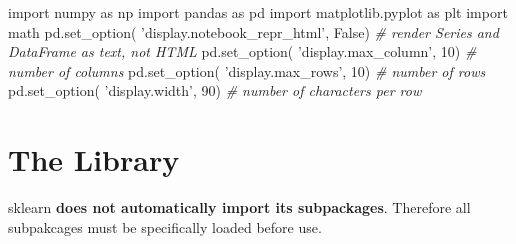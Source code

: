 \documentclass[
]{book}
\newenvironment{Shaded}{\begin{snugshade}}{\end{snugshade}}
\newcommand{\CommentTok}[1]{\textcolor[rgb]{0.37,0.37,0.37}{\textit{#1}}}
\newcommand{\DecValTok}[1]{\textcolor[rgb]{0.06,0.06,0.06}{#1}}
\newcommand{\ImportTok}[1]{#1}
\newcommand{\NormalTok}[1]{#1}
\newcommand{\StringTok}[1]{\textcolor[rgb]{0.5,0.5,0.5}{#1}}
\newcommand{\VariableTok}[1]{\textcolor[rgb]{0,0,0}{#1}}
\begin{document}
\begin{Shaded}
\begin{Highlighting}[]
\ImportTok{import}\NormalTok{ numpy }\ImportTok{as}\NormalTok{ np}
\ImportTok{import}\NormalTok{ pandas }\ImportTok{as}\NormalTok{ pd}
\ImportTok{import}\NormalTok{ matplotlib.pyplot }\ImportTok{as}\NormalTok{ plt}
\ImportTok{import}\NormalTok{ math}
\NormalTok{pd.set_option( }\StringTok{'display.notebook_repr_html'}\NormalTok{, }\VariableTok{False}\NormalTok{)  }\CommentTok{# render Series and DataFrame as text, not HTML}
\NormalTok{pd.set_option( }\StringTok{'display.max_column'}\NormalTok{, }\DecValTok{10}\NormalTok{)    }\CommentTok{# number of columns}
\NormalTok{pd.set_option( }\StringTok{'display.max_rows'}\NormalTok{, }\DecValTok{10}\NormalTok{)     }\CommentTok{# number of rows}
\NormalTok{pd.set_option( }\StringTok{'display.width'}\NormalTok{, }\DecValTok{90}\NormalTok{)        }\CommentTok{# number of characters per row}
\end{Highlighting}
\end{Shaded}

\hypertarget{the-library}{%
\section{The Library}\label{the-library}}

sklearn \textbf{does not automatically import its subpackages}. Therefore all subpakcages must be specifically loaded before use.
\end{document}
